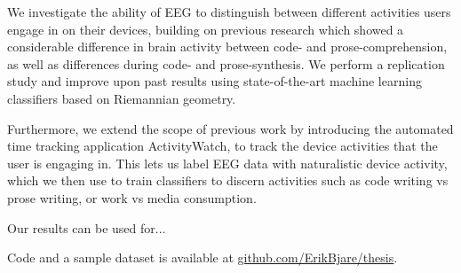 We investigate the ability of EEG to distinguish between different activities users engage in on their devices, building on previous research which showed a considerable difference in brain activity between code- and prose-comprehension, as well as differences during code- and prose-synthesis. We perform a replication study and improve upon past results using state-of-the-art machine learning classifiers based on Riemannian geometry.

Furthermore, we extend the scope of previous work by introducing the automated time tracking application ActivityWatch, to track the device activities that the user is engaging in. This lets us label EEG data with naturalistic device activity, which we then use to train classifiers to discern activities such as code writing vs prose writing, or work vs media consumption.

Our results can be used for...

Code and a sample dataset is available at \href{https://github.com/ErikBjare/thesis}{github.com/ErikBjare/thesis}.
